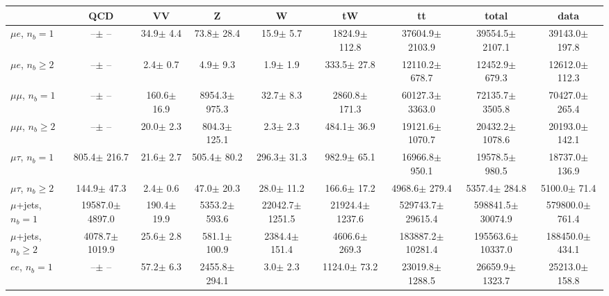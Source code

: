 \begin{sidewaystable}[p]
    \centering
    \setlength{\tabcolsep}{0.4em}
    \renewcommand{\arraystretch}{2}
    \small
    \begin{tabular}{l|cccccc|cc}
    \hline
        & QCD & VV  & Z & W & tW & tt & total & data      \\
    \hline
    
    $\mu e$, $n_b=1$                   &       --$\pm$     -- &     34.9$\pm$    4.4 &     73.8$\pm$   28.4 &     15.9$\pm$    5.7 &   1824.9$\pm$  112.8 &  37604.9$\pm$ 2103.9 &  39554.5$\pm$ 2107.1 &  39143.0$\pm$  197.8 \\ 
    $\mu e$, $n_b\geq2$                &       --$\pm$     -- &      2.4$\pm$    0.7 &      4.9$\pm$    9.3 &      1.9$\pm$    1.9 &    333.5$\pm$   27.8 &  12110.2$\pm$  678.7 &  12452.9$\pm$  679.3 &  12612.0$\pm$  112.3 \\ 
    \hline
    $\mu\mu$, $n_b=1$                  &       --$\pm$     -- &    160.6$\pm$   16.9 &   8954.3$\pm$  975.3 &     32.7$\pm$    8.3 &   2860.8$\pm$  171.3 &  60127.3$\pm$ 3363.0 &  72135.7$\pm$ 3505.8 &  70427.0$\pm$  265.4 \\ 
    $\mu\mu$, $n_b\geq2$               &       --$\pm$     -- &     20.0$\pm$    2.3 &    804.3$\pm$  125.1 &      2.3$\pm$    2.3 &    484.1$\pm$   36.9 &  19121.6$\pm$ 1070.7 &  20432.2$\pm$ 1078.6 &  20193.0$\pm$  142.1 \\ 
    \hline
    $\mu\tau$, $n_b=1$                 &    805.4$\pm$  216.7 &     21.6$\pm$    2.7 &    505.4$\pm$   80.2 &    296.3$\pm$   31.3 &    982.9$\pm$   65.1 &  16966.8$\pm$  950.1 &  19578.5$\pm$  980.5 &  18737.0$\pm$  136.9 \\ 
    $\mu\tau$, $n_b\geq2$              &    144.9$\pm$   47.3 &      2.4$\pm$    0.6 &     47.0$\pm$   20.3 &     28.0$\pm$   11.2 &    166.6$\pm$   17.2 &   4968.6$\pm$  279.4 &   5357.4$\pm$  284.8 &   5100.0$\pm$   71.4 \\ 
    \hline
    $\mu$+jets, $n_b=1$                &  19587.0$\pm$ 4897.0 &    190.4$\pm$   19.9 &   5353.2$\pm$  593.6 &  22042.7$\pm$ 1251.5 &  21924.4$\pm$ 1237.6 & 529743.7$\pm$29615.4 & 598841.5$\pm$30074.9 & 579800.0$\pm$  761.4 \\ 
    $\mu$+jets, $n_b\geq2$             &   4078.7$\pm$ 1019.9 &     25.6$\pm$    2.8 &    581.1$\pm$  100.9 &   2384.4$\pm$  151.4 &   4606.6$\pm$  269.3 & 183887.2$\pm$10281.4 & 195563.6$\pm$10337.0 & 188450.0$\pm$  434.1 \\ 
    \hline
    $e e$, $n_b=1$                     &       --$\pm$     -- &     57.2$\pm$    6.3 &   2455.8$\pm$  294.1 &      3.0$\pm$    2.3 &   1124.0$\pm$   73.2 &  23019.8$\pm$ 1288.5 &  26659.9$\pm$ 1323.7 &  25213.0$\pm$  158.8 \\ 

\end{tabular}
\end{sidewaystable}

